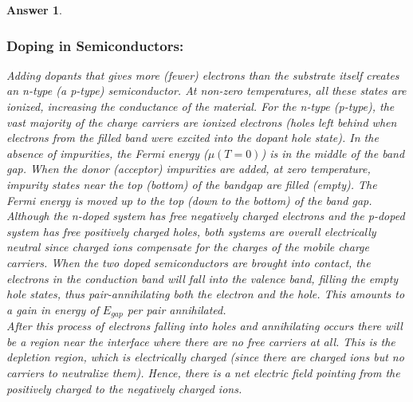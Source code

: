 \documentclass[a4paper]{article}
\newtheorem{ans}{Answer}[subsection]
\theoremstyle{new}
\begin{document}
\begin{ans}
\subsubsection*{Doping in Semiconductors:}
Adding dopants that gives more (fewer) electrons than the substrate itself creates an n-type (a p-type) semiconductor. At non-zero temperatures, all these states are ionized, increasing the conductance of the material. For the n-type (p-type), the vast majority of the charge carriers are ionized electrons (holes left behind when electrons from the filled band were excited into the dopant hole state). In the absence of impurities, the Fermi energy ($\mu(T=0)$) is in the middle of the band gap. When the donor (acceptor) impurities are added, at zero temperature, impurity states near the top (bottom) of the bandgap are filled (empty). The Fermi energy is moved up to the top (down to the bottom) of the band gap.\\[5pt]
Although the n-doped system has free negatively charged electrons and the p-doped system has free positively charged holes, both systems are overall electrically neutral since charged ions compensate for the charges of the mobile charge carriers. When the two doped semiconductors are brought into contact, the electrons in the conduction band will fall into the valence band, filling the empty hole states, thus pair-annihilating both the electron and the hole. This amounts to a gain in energy of $E_{gap}$ per pair annihilated.\\[5pt]
After this process of electrons falling into holes and annihilating occurs there will be a region near the interface where there are no free carriers at all. This is the depletion region, which is electrically charged (since there are charged ions but no carriers to neutralize them). Hence, there is a net electric field pointing from the positively charged to the negatively charged ions.
\newpage

\end{ans}
\end{document}
